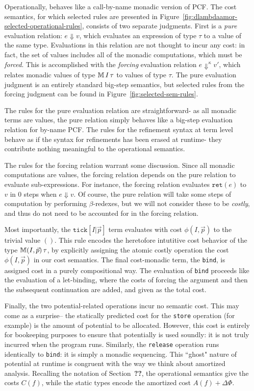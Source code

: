 Operationally, \dlambdaamor behaves like a call-by-name monadic version of PCF. The cost semantics, for which selected rules are presented in Figure~\ref{fig:dlambdaamor-selected-operational-rules}, consists of two separate judgments. First is a \textit{pure} evaluation relation: $e \Downarrow v$, which evaluates an expression of type $\tau$ to a value of the same type. Evaluations in this relation are not thought to incur any cost: in fact, the set of values includes all of the monadic computations, which must be \textit{forced}. This is accomplished with the \textit{forcing} evaluation relation $e \Downarrow^\kappa v'$, which relates monadic values of type $\mathbb{M} \, I \, \tau$ to values of type $\tau$. The pure evaluation judgment is an entirely standard big-step semantics, but selected rules from the forcing judgment can be found in Figure~\ref{fig:selected-sem-rules}.

The rules for the pure evaluation relation are straightforward- as all monadic terms are values, the pure relation simply behaves like a big-step evaluation relation for by-name PCF. The rules for the refinement syntax at term level behave as if the syntax for refinements has been erased at runtime- they contribute nothing meaningful to the operational semantics.

The rules for the forcing relation warrant some discussion. Since all monadic computations are values, the forcing relation depends on the pure relation to evaluate sub-expressions. For instance, the forcing relation evaluates $\texttt{ret}(e)$ to $v$ in $0$ steps when $e \Downarrow v$. Of course, the pure relation will take some steps of computation by performing $\beta$-redexes, but we will not consider these to be \textit{costly}, and thus do not need to be accounted for in the forcing relation.

Most importantly, the $\texttt{tick}[I|\vec{p}]$ term evaluates with cost $\phi(I,\vec{p})$ to the trivial value $()$. This rule encodes the heretofore intutitive cost behavior of the type $\mathbb{M} (I,\vec{p}) \, \tau$, by explicitly assigning the atomic costly operation the cost $\phi(I,\vec{p})$ in our cost semantics.  The final cost-monadic term, the \texttt{bind}, is assigned cost in a purely compositional way. The evaluation of \texttt{bind} proceeds like the evaluation of a let-binding, where the costs of forcing the argument and then the subsequent continuation are added, and given as the total cost.

Finally, the two potential-related operations incur no semantic cost. This may come as a surprise-- the statically predicted cost for the \texttt{store} operation (for example) is the amount of potential to be allocated. However, this cost is entirely for bookeeping purposes to ensure that potentially is used soundly: it is not truly incurred when the program runs. Similarly, the \texttt{release} operation runs identically to \texttt{bind}: it is simply a monadic sequencing. This ``ghost" nature of potential at runtime is congruent with the way we think about amortized analysis. Recalling the notation of Section~\textbf{??}, the operational semantics give the costs $C(f)$, while the static types encode the amortized cost $A(f) + \Delta\Phi$.

